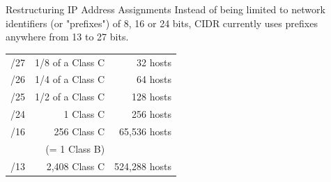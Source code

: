 \begin{frame}{Restructuring IP Address Assignments}
    Instead of being limited to network identifiers (or "prefixes") of 8, 16 or 24 bits,
    CIDR currently uses prefixes anywhere from 13 to 27 bits.
    \begin{center}
      \begin{tabular}{rrr}
        /27 & 1/8 of a Class C & 32 hosts\\
        /26 & 1/4 of a Class C & 64 hosts\\
        /25 & 1/2 of a Class C & 128 hosts\\
        /24 & 1 Class C & 256 hosts\\
        /16 & 256 Class C & 65,536 hosts\\
            & (= 1 Class B) &\\
        /13 & 2,408 Class C & 524,288 hosts\\
      \end{tabular}
    \end{center}
\end{frame}

